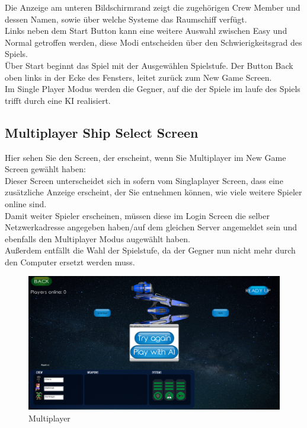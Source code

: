 \documentclass[fontsize=12pt,paper=a4,twoside]{scrartcl}
\begin{document}
Die Anzeige am unteren Bildschirmrand zeigt die zugehörigen Crew Member und dessen Namen, sowie über welche Systeme das Raumschiff verfügt.\\
Links neben dem Start Button kann eine weitere Auswahl zwischen Easy und Normal getroffen werden, diese Modi entscheiden über den Schwierigkeitsgrad des Spiels.\\
Über Start beginnt das Spiel mit der Ausgewählen Spielstufe.
Der Button Back oben links in der Ecke des Fensters, leitet zurück zum New Game Screen.\\
Im Single Player Modus werden die Gegner, auf die der Spiele im laufe des Spiels trifft durch eine KI realisiert.

\newpage
\subsection{Multiplayer Ship Select Screen}

Hier sehen Sie den Screen, der erscheint, wenn Sie  Multiplayer im New Game Screen gewählt haben:\\
Dieser Screen unterscheidet sich in sofern vom Singlaplayer Screen, dass eine zusätzliche Anzeige erscheint, der Sie entnehmen können, wie viele weitere Spieler online sind.\\
Damit weiter Spieler erscheinen, müssen diese im Login Screen die selber Netzwerkadresse angegeben haben/auf dem gleichen Server angemeldet sein und ebenfalls den Multiplayer Modus augewählt haben.\\
Außerdem entfällt die Wahl der Spielstufe, da der Gegner nun nicht mehr durch den Computer ersetzt werden muss.

\begin{figure}[htp]
	\centering
	\includegraphics[width=1.00\linewidth]{pics/MultiPlayer01.png}
	\caption{Multiplayer}
	\label{fig1}
\end{figure}
\end{document}
